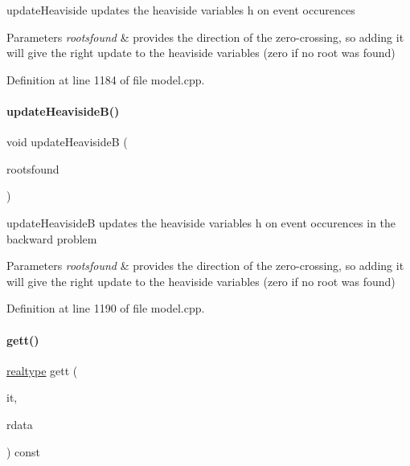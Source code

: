 update\+Heaviside updates the heaviside variables h on event occurences


\begin{DoxyParams}{Parameters}
{\em rootsfound} & provides the direction of the zero-\/crossing, so adding it will give the right update to the heaviside variables (zero if no root was found) \\
\hline
\end{DoxyParams}


Definition at line 1184 of file model.\+cpp.

\mbox{\label{classamici_1_1_model_a430edd546832d0abbea6472eb7e43da8}} 
\paragraph{\texorpdfstring{update\+Heaviside\+B()}{updateHeavisideB()}}
{\footnotesize\ttfamily void update\+HeavisideB (\begin{DoxyParamCaption}\item[{const int $\ast$}]{rootsfound }\end{DoxyParamCaption})}

update\+HeavisideB updates the heaviside variables h on event occurences in the backward problem


\begin{DoxyParams}{Parameters}
{\em rootsfound} & provides the direction of the zero-\/crossing, so adding it will give the right update to the heaviside variables (zero if no root was found) \\
\hline
\end{DoxyParams}


Definition at line 1190 of file model.\+cpp.

\mbox{\label{classamici_1_1_model_a09e0a747a99fb59657e71690ce69726b}} 
\paragraph{\texorpdfstring{gett()}{gett()}}
{\footnotesize\ttfamily \mbox{\hyperlink{namespaceamici_a1bdce28051d6a53868f7ccbf5f2c14a3}{realtype}} gett (\begin{DoxyParamCaption}\item[{const int}]{it,  }\item[{const \mbox{\hyperlink{classamici_1_1_return_data}{Return\+Data}} $\ast$}]{rdata }\end{DoxyParamCaption}) const}

